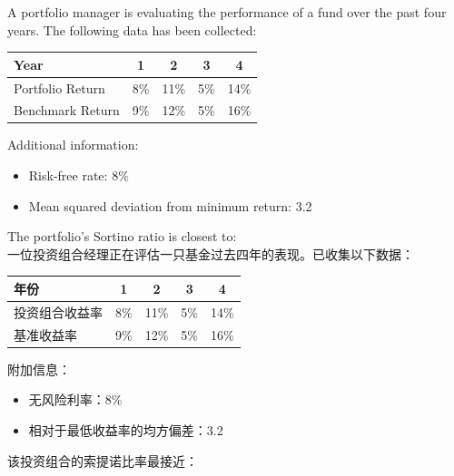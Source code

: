 \documentclass{article}
\newcounter{question} %
\begin{document}
\begin{question}
    A portfolio manager is evaluating the performance of a fund over the past four years. The following data has been collected:

    \begin{center}
        \begin{tabular}{|l|c|c|c|c|}
            \hline
            \textbf{Year} & \textbf{1} & \textbf{2} & \textbf{3} & \textbf{4} \\
            \hline
            Portfolio Return & 8\% & 11\% & 5\% & 14\% \\
            \hline
            Benchmark Return & 9\% & 12\% & 5\% & 16\% \\
            \hline
        \end{tabular}
    \end{center}

    Additional information:
    \begin{itemize}
        \item Risk-free rate: 8\%
        \item Mean squared deviation from minimum return: 3.2
    \end{itemize}

    The portfolio's Sortino ratio is closest to:
    \\    一位投资组合经理正在评估一只基金过去四年的表现。已收集以下数据：

    \begin{center}
        \begin{tabular}{|l|c|c|c|c|}
            \hline
            \textbf{年份} & \textbf{1} & \textbf{2} & \textbf{3} & \textbf{4} \\
            \hline
            投资组合收益率 & 8\% & 11\% & 5\% & 14\% \\
            \hline
            基准收益率 & 9\% & 12\% & 5\% & 16\% \\
            \hline
        \end{tabular}
    \end{center}

    附加信息：
    \begin{itemize}
        \item 无风险利率：8\%
        \item 相对于最低收益率的均方偏差：3.2
    \end{itemize}

    该投资组合的索提诺比率最接近：
\end{question}
\end{document}
